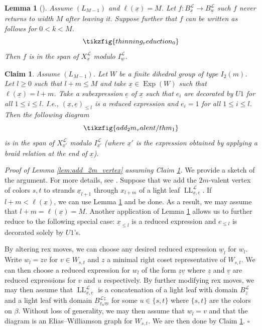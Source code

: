 \documentclass{amsart}
\newcommand{\scrL}{\mathcal{L}}
\DeclareMathOperator{\LL}{LL}
\DeclareMathOperator{\Exp}{Exp}
\newcommand{\ue}{\underline{e}}
\newcommand{\uw}{\underline{w}}
\newcommand{\ux}{\underline{x}}
\newtheorem{lemma}[subsubsection]{Lemma}
\newtheorem{claim}[subsubsection]{Claim}
\theoremstyle{definition}
\newenvironment{midsecproof}[1]{\vspace{\topsep} \noindent \textit{Proof of #1.}}{\hfill $\square$}
\numberwithin{equation}{subsection}
\begin{document}
\begin{lemma}[{\cite[Claim 7.12]{EW}}]\label{lem:thinning_reduction}
    Assume $(L_{M-1})$ and $\ell (\ux) = M$. 
    Let $f : B_{\ux}^{\scrL} \to B_{\uw}^{\scrL}$ such $f$ never returns to width $M$ after leaving it.
    Suppose further that $f$ can be written as follows for $0 < k < M$.
    \[\tikzfig{thinning_reduction_0}\]
    Then $f$ is in the span of $X_{\ux}^{\scrL}$ modulo $I_{\uw}^{\scrL}$.  
\end{lemma}

\begin{claim}\label{claim:dihedral_add_2m_vertex}
    Assume $(L_{M-1})$. Let $W$ be a finite dihedral group of type $I_2 (m)$.
    Let $l \geq 0$ such that $l + m \leq M$ and take $\ux \in \Exp (W)$ such that $\ell (\ux) = l + m$.
    Take a subexpression $\ue$ of $\ux$ such that $e_i$ are decorated by $U1$ for all $1 \leq i \leq l$. I.e., $(\ux, \ue)_{\leq l}$ is a reduced expression and $e_i = 1$ for all $1 \leq i \leq l$.
    Then the following diagram
    \begin{equation}\label{thm:1}
            \tikzfig{add_2m_valent/thm_1}
    \end{equation}
    is in the span of $X_{\ux'}^{\scrL}$ modulo $I_{\ux'}^{\scrL}$ (where $\ux'$ is the expression obtained by applying a braid relation at the end of $\ux$).
\end{claim}

\begin{midsecproof}{Lemma \ref{lem:add_2m_vertex} assuming Claim \ref{claim:dihedral_add_2m_vertex}}
    We provide a sketch of the argument. For more details, see \cite[Claim 7.13]{EW}.
    Suppose that we add the $2m$-valent vertex of colors $s,t$ to strands $\ux_{l + 1}$ through $x_{l + m}$ of a light leaf $\LL_{\ux, \ue}^{\scrL}$.
    If $l + m < \ell (\ux)$, we can use Lemma \ref{lem:thinning_reduction} and be done.
    As a result, we may assume that $l+m = \ell (\ux) = M$.
    Another application of Lemma \ref{lem:thinning_reduction} allows us to further reduce to the following special case: $\ux_{\leq l}$ is a reduced expression and $e_{\leq l}$ is decorated solely by $U1$'s.

    By altering rex moves, we can choose any desired reduced expression $\underline{w}_l$ for $w_l$.
    Write $w_l = zv$ for $v \in W_{s,t}$ and $z$ a minimal right coset representative of $W_{s,t}$.
    We can then choose a reduced expression for $w_{l}$ of the form $\underline{z} \underline{v}$ where $\underline{z}$ and $\underline{v}$ are reduced expressions for $v$ and $u$ respectively.
    By further modifying rex moves, we may then assume that $\LL_{\ux, \ue}^{\scrL}$ is a concatenation of a light leaf with domain $B_{\underline{z}}^{\scrL}$ and a light leaf with domain $B_{\underline{v} {}_u \underline{m}}^{\scrL \underline{z}}$ for some $u \in \{s,t\}$ where $\{s,t\}$ are the colors on $\beta$.
    Without loss of generality, we may then assume that $w_l = v$ and that the diagram is an Elias--Williamson graph for $W_{s,t}$.
    We are then done by Claim \ref{claim:dihedral_add_2m_vertex}.  
\end{midsecproof}
\end{document}
